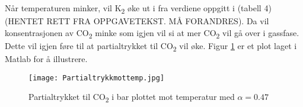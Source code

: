 Når temperaturen minker, vil K\textsubscript{2} øke ut i fra verdiene oppgitt i (tabell 4)(HENTET RETT FRA OPPGAVETEKST. MÅ FORANDRES). Da vil konsentrasjonen av CO\textsubscript{2} minke som igjen vil si at mer CO\textsubscript{2} vil gå over i gassfase. Dette vil igjen føre til at partialtrykket til CO\textsubscript{2} vil øke. Figur \ref{figurting} er et plot laget i Matlab for å illustrere.

\begin{figure}[H]  
\texttt{[image: Partialtrykkmottemp.jpg]}
\centering
\caption{Partialtrykket til CO\textsubscript{2} i bar plottet mot temperatur med $\alpha=0.47$}
\label{figurting}
\end{figure}
